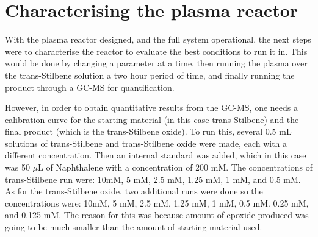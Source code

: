 \section{Characterising the plasma reactor}

With the plasma reactor designed, and the full system operational, the next steps were to characterise the reactor to evaluate the best conditions to run it in. This would be done by changing a parameter at a time, then running the plasma over the trans-Stilbene solution a two hour period of time, and finally running the product through a GC-MS for quantification.

However, in order to obtain quantitative results from the GC-MS, one needs a calibration curve for the starting material (in this case trans-Stilbene) and the final product (which is the trans-Stilbene oxide). To run this, several 0.5 mL solutions of trans-Stilbene and trans-Stilbene oxide were made, each with a different concentration. Then an internal standard was added, which in this case was 50 $\mu$L of Naphthalene with a concentration of 200 mM. The concentrations of trans-Stilbene run were: 10mM, 5 mM, 2.5 mM, 1.25 mM, 1 mM, and 0.5 mM. As for the trans-Stilbene oxide, two additional runs were done so the concentrations were: 10mM, 5 mM, 2.5 mM, 1.25 mM, 1 mM, 0.5 mM. 0.25 mM, and 0.125 mM. The reason for this was because amount of epoxide produced was going to be much smaller than the amount of starting material used. 

